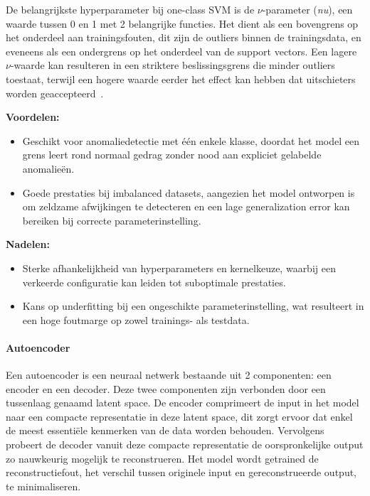 De belangrijkste hyperparameter bij one-class SVM is de $\nu$-parameter (\textit{nu}), een waarde tussen 0 en 1 met 2 belangrijke functies. 
Het dient als een bovengrens op het onderdeel aan trainingsfouten, dit zijn de outliers binnen de trainingsdata, en eveneens als een ondergrens op het onderdeel van de support vectors.
Een lagere $\nu$-waarde kan resulteren in een striktere beslissingsgrens die minder outliers toestaat, terwijl een hogere waarde eerder het effect kan hebben dat uitschieters worden geaccepteerd~\autocite{Scholkopf2001}. 

\textbf{Voordelen:}
\begin{itemize}
    \item Geschikt voor anomaliedetectie met één enkele klasse, doordat het model
    een grens leert rond normaal gedrag zonder nood aan expliciet gelabelde
    anomalieën.
    \item Goede prestaties bij imbalanced datasets, aangezien het model ontworpen
    is om zeldzame afwijkingen te detecteren en een lage generalization error kan
    bereiken bij correcte parameterinstelling.
\end{itemize}

\textbf{Nadelen:}
\begin{itemize}
    \item Sterke afhankelijkheid van hyperparameters en kernelkeuze, waarbij een
    verkeerde configuratie kan leiden tot suboptimale prestaties.
    \item Kans op underfitting bij een ongeschikte parameterinstelling, wat
    resulteert in een hoge foutmarge op zowel trainings- als testdata.
\end{itemize}

\medskip

\paragraph{Autoencoder}


Een autoencoder is een neuraal netwerk bestaande uit 2 componenten: een encoder en een decoder. Deze twee componenten zijn verbonden door een tussenlaag genaamd latent space. 
De encoder comprimeert de input in het model naar een compacte representatie in deze latent space, dit zorgt ervoor dat enkel de meest essentiële kenmerken van de data worden behouden. 
Vervolgens probeert de decoder vanuit deze compacte representatie de oorspronkelijke output zo nauwkeurig mogelijk te reconstrueren. Het model wordt getrained de reconstructiefout, het verschil tussen originele input en gereconstrueerde output, te minimaliseren\autocite{Chikezie2025}.

